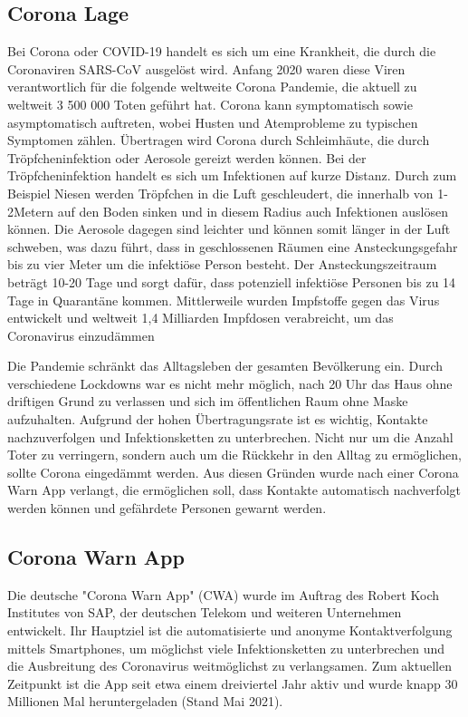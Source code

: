 \documentclass[conference]{IEEEtran}
\begin{document}
\subsection{Corona Lage}
Bei Corona oder COVID-19 handelt es sich um eine Krankheit, die durch die Coronaviren SARS-CoV ausgelöst wird. 
Anfang 2020 waren diese Viren verantwortlich für die folgende weltweite Corona Pandemie, die aktuell zu weltweit 3 500 000 Toten geführt hat. 
Corona kann symptomatisch sowie asymptomatisch auftreten, wobei Husten und Atemprobleme zu typischen Symptomen zählen.
Übertragen wird Corona durch Schleimhäute, die durch Tröpfcheninfektion oder Aerosole gereizt werden können.
Bei der Tröpfcheninfektion handelt es sich um Infektionen auf kurze Distanz. Durch zum Beispiel Niesen werden Tröpfchen in die Luft geschleudert, 
die innerhalb von 1-2Metern auf den Boden sinken und in diesem Radius auch Infektionen auslösen können. 
Die Aerosole dagegen sind leichter und können somit länger in der Luft schweben, 
was dazu führt, dass in geschlossenen Räumen eine Ansteckungsgefahr bis zu vier Meter um die infektiöse Person besteht. 
Der Ansteckungszeitraum beträgt 10-20 Tage und sorgt dafür, dass potenziell infektiöse Personen bis zu 14 Tage in Quarantäne kommen.
Mittlerweile wurden Impfstoffe gegen das Virus entwickelt und weltweit 1,4 Milliarden Impfdosen verabreicht, um das Coronavirus einzudämmen

Die Pandemie schränkt das Alltagsleben der gesamten Bevölkerung ein. 
Durch verschiedene Lockdowns war es nicht mehr möglich, nach 20 Uhr das Haus ohne driftigen Grund zu verlassen und sich im öffentlichen Raum ohne Maske aufzuhalten. 
Aufgrund der hohen Übertragungsrate ist es wichtig, Kontakte nachzuverfolgen und Infektionsketten zu unterbrechen.
Nicht nur um die Anzahl Toter zu verringern, sondern auch um die Rückkehr in den Alltag zu ermöglichen, sollte Corona eingedämmt werden.
Aus diesen Gründen wurde nach einer Corona Warn App verlangt, die ermöglichen soll, dass Kontakte automatisch nachverfolgt werden können und gefährdete Personen gewarnt werden.

\subsection{Corona Warn App}
Die deutsche "Corona Warn App" (CWA) wurde im Auftrag des Robert Koch Institutes von SAP, der deutschen Telekom und weiteren Unternehmen entwickelt. 
Ihr Hauptziel ist die automatisierte und anonyme Kontaktverfolgung mittels Smartphones, um möglichst viele Infektionsketten zu unterbrechen und die Ausbreitung des Coronavirus weitmöglichst zu verlangsamen. 
Zum aktuellen Zeitpunkt ist die App seit etwa einem dreiviertel Jahr aktiv und  wurde knapp 30 Millionen Mal heruntergeladen (Stand Mai 2021).
\end{document}
